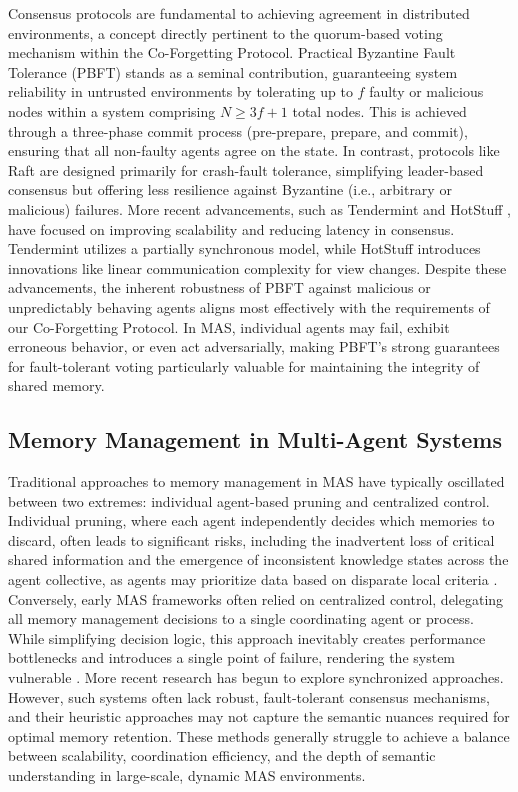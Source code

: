 \documentclass[conference]{IEEEtran}
\begin{document}
Consensus protocols are fundamental to achieving agreement in distributed environments, a concept directly pertinent to the quorum-based voting mechanism within the Co-Forgetting Protocol. Practical Byzantine Fault Tolerance (PBFT) \cite{Castro1999} stands as a seminal contribution, guaranteeing system reliability in untrusted environments by tolerating up to $f$ faulty or malicious nodes within a system comprising $N \geq 3f + 1$ total nodes. This is achieved through a three-phase commit process (pre-prepare, prepare, and commit), ensuring that all non-faulty agents agree on the state. In contrast, protocols like Raft \cite{Ongaro2014} are designed primarily for crash-fault tolerance, simplifying leader-based consensus but offering less resilience against Byzantine (i.e., arbitrary or malicious) failures. More recent advancements, such as Tendermint \cite{Buchman2018} and HotStuff \cite{Yin2019}, have focused on improving scalability and reducing latency in consensus. Tendermint utilizes a partially synchronous model, while HotStuff introduces innovations like linear communication complexity for view changes. Despite these advancements, the inherent robustness of PBFT against malicious or unpredictably behaving agents aligns most effectively with the requirements of our Co-Forgetting Protocol. In MAS, individual agents may fail, exhibit erroneous behavior, or even act adversarially, making PBFT’s strong guarantees for fault-tolerant voting particularly valuable for maintaining the integrity of shared memory.

\subsection{Memory Management in Multi-Agent Systems}

Traditional approaches to memory management in MAS have typically oscillated between two extremes: individual agent-based pruning and centralized control. Individual pruning, where each agent independently decides which memories to discard, often leads to significant risks, including the inadvertent loss of critical shared information and the emergence of inconsistent knowledge states across the agent collective, as agents may prioritize data based on disparate local criteria \cite{Stone2000}. Conversely, early MAS frameworks often relied on centralized control, delegating all memory management decisions to a single coordinating agent or process. While simplifying decision logic, this approach inevitably creates performance bottlenecks and introduces a single point of failure, rendering the system vulnerable \cite{Wooldridge2009}. More recent research has begun to explore synchronized approaches. However, such systems often lack robust, fault-tolerant consensus mechanisms, and their heuristic approaches may not capture the semantic nuances required for optimal memory retention. These methods generally struggle to achieve a balance between scalability, coordination efficiency, and the depth of semantic understanding in large-scale, dynamic MAS environments.
\end{document}
